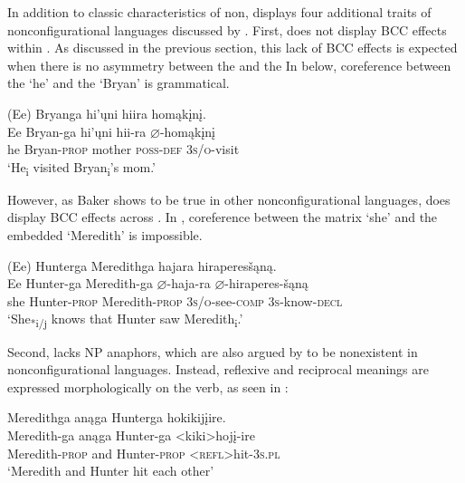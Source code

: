 \documentclass[output=paper]{LSP/langsci}
\begin{document}
In addition to  classic characteristics of non,  displays four additional traits of nonconfigurational languages discussed by \citet{Baker1996}. First,  does not display BCC effects within .  As discussed in the previous section, this lack of BCC effects is expected when there is no asymmetry between the  and the  In  below, coreference between the  `he' and the  `Bryan' is grammatical.

\begin{exe}
\ex\label{ex:jrs:16}	
\glll (Ee) 	Bryanga 			hi'\k{u}ni 	hiira 				homąk\k{i}n\k{i}. \\
Ee 		Bryan-ga 		hi'\k{u}ni 	hii-ra 			$\varnothing$-homąk\k{i}n\k{i} \\
he 		Bryan-\textsc{prop} mother 	\textsc{poss-def} 	\textsc{3s/o}-visit  \\
\trans `He\textsubscript{i} visited Bryan\textsubscript{i}'s mom.'
\end{exe}
However, as Baker shows to be true in other nonconfigurational languages,  does display BCC effects across . In , coreference between the matrix  `she' and the embedded  `Meredith' is impossible.

\begin{exe}
\ex\label{ex:jrs:17}	
\glll (Ee) 	Hunterga 	Meredithga		hajara 						hiraperes\v{s}ąną. \\
 Ee 		Hunter-ga 	Meredith-ga 		$\varnothing$-haja-ra 				$\varnothing$-hiraperes-\v{s}ąną \\
she 		Hunter-\textsc{prop} 	Meredith-\textsc{prop} 	\textsc{3s/o}-see-\textsc{comp} 	\textsc{3s}-know-\textsc{decl}  \\
\trans `She\textsubscript{*i/j} knows that Hunter saw Meredith\textsubscript{i}.'
\end{exe}	

Second,  lacks NP anaphors, which are also argued by \citet{Baker1996} to be nonexistent in nonconfigurational languages. Instead, reflexive and reciprocal meanings are expressed morphologically on the verb, as seen in :

\begin{exe}
\ex\label{ex:jrs:18} 
\glll Meredithga		anąga 	Hunterga 			hokikij\k{i}ire.\\
Meredith-ga	 	anąga 	Hunter-ga 			<kiki>hoj\k{i}-ire \\
Meredith-\textsc{prop} and 		Hunter-\textsc{prop} 	<\textsc{refl}>hit-\textsc{3s.pl} \\
\trans `Meredith and Hunter hit each other'
\end{exe}
	
\end{document}
